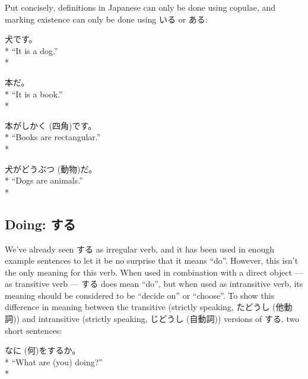 \documentclass[11pt, b5paper, twoside, openright, onecolumn]{book}
\makeatletter
\newcommand*{\rubystack}[2]{{\relscale{0.5}%
  \begin{tabular}[b]{@{}c@{}}%
    {#1}\\%
   {\textscale{2}{#2}}%
  \end{tabular}}%
}
\DeclareRobustCommand*{\ruby}[2]{%
  \mbox{%
    \setlength{\parskip}{0ex}%
    \BeginAccSupp{method=pdfstringdef,ActualText={#1}}%
      \rubystack{\phantom{#2}}{#1}%
      \llap{%
        \rubystack{#2}{\phantom{#1}}%
      }%
    \EndAccSupp{}%
  }%
}
\renewcommand*{\ruby}[2]{#2 (#1)}%
\newenvironment{exampleblock}{
\setlength{\parindent}{0.6in}
\begin{minipage}[t]{\dimexpr\textwidth-\parindent}}
{\end{minipage}}
\makeatother
\begin{document}
Put concisely‚ definitions in Japanese can only be done using copulae‚ and marking existence can only be done using いる or ある:

\vspace{0.4cm}
\begin{exampleblock}
犬です。 \\* 
“It is a dog.” \\* 
\end{exampleblock}
\vspace{0.2cm}

\begin{exampleblock}
本だ。 \\* 
“It is a book.” \\* 
\end{exampleblock}
\vspace{0.2cm}

\begin{exampleblock}
本が\ruby{四角}{しかく}です。 \\* 
“Books are rectangular.” \\* 
\end{exampleblock}
\vspace{0.2cm}

\begin{exampleblock}
犬が\ruby{動物}{どうぶつ}だ。 \\* 
“Dogs are animals.” \\* 
\end{exampleblock}
\subsection{Doing: する}


We’ve already seen する as irregular verb‚ and it has been used in enough example sentences to let it be no surprise that it means “do”. However‚ this isn’t the only meaning for this verb. When used in combination with a direct object — as transitive verb — する does mean “do”‚ but when used as intransitive verb‚ its meaning should be considered to be “decide on” or “choose”.  To show this difference in meaning between the transitive (strictly speaking‚ \ruby{他動詞}{たどうし}) and intransitive (strictly speaking‚ \ruby{自動詞}{じどうし}) versions of する‚ two short sentences:

\vspace{0.4cm}
\begin{exampleblock}
\ruby{何}{なに}をするか。 \\* 
“What are (you) doing?” \\* 
\end{exampleblock}
\vspace{0.2cm}
\end{document}
